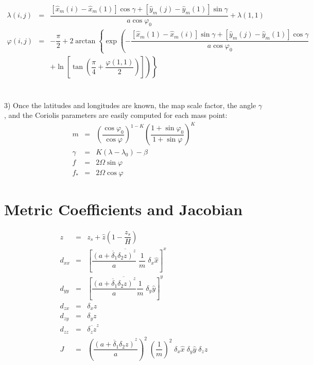 \begin{eqnarray}
\lambda (i,j) &=&  \dfrac{\left[ \widehat{x}_{m}(i)-\widehat{x}_{m}(1) \right]
\cos \gamma + \left[\widehat{y}_{m}(j)-\widehat{y}_{m}(1) \right]\sin \gamma  }
{a \cos \varphi _{0}}
  + \lambda(1,1) \nonumber \\
\varphi (i,j) & = & -\dfrac{\pi}{2} + 2 \arctan \left\{ \exp \left( -
\dfrac{\left[\widehat{x}_{m}(1)-\widehat{x}_{m}(i) \right]
\sin \gamma + \left[\widehat{y}_{m}(j)-\widehat{y}_{m}(1) \right]\cos \gamma  }{a \cos \varphi _{0} } \right. \right.  \nonumber \\
& & \left. \left. +  \ln \left[ \tan (\dfrac{\pi}{4} +\dfrac{ \varphi(1,1)}{2})
\right]
\right)
\right\}
\end{eqnarray}
\\
\\
3) Once the latitudes and longitudes are known, the map scale factor,
the angle $\gamma$, and the Coriolis parameters are easily
computed for each mass point:
\begin{eqnarray}
m&=&\left( \dfrac{\cos \varphi _{0}}{\cos \varphi}\right)^{1-K}
\left( \dfrac{1 + \sin\varphi _{0}}{1 + \sin\varphi} \right)^{K} \\
\gamma & = & K (\lambda - \lambda _{0}) - \beta \nonumber \\
f&=&2\Omega \sin\varphi \\
f_{*}&=&2\Omega \cos\varphi
\end{eqnarray}


\section{Metric Coefficients and Jacobian}

\begin{eqnarray}
z & = & z_{s} + \widehat{z} \left( 1 - \dfrac{z_{s}}{H} \right) \\
 d_{xx} &  = & \overline{ \left[ \dfrac{\overline{\left(a+ \delta _{1}\delta _{2} z\right)}^{z}}{a}
\;  \dfrac{1}{m}\;  \delta_{x}\widehat{x} \right]}^{x} \\
 d_{yy}  & = & \overline{ \left[\dfrac{ \overline{\left(a+ \delta _{1}\delta _{2} z \right)}^{z}}{a}
 \dfrac{1}{m}\; \delta_y \widehat{y} \right] }^{y} \\
 d_{zx} & = & \delta_{x} z \\  d_{zy} & = & \delta_{y} z \\
 d_{zz} & = & \overline{\delta_{z} z}^z  \\
  J   &  = & \left(
 \dfrac{ \overline{ \left( a+ \delta _{1}\delta _{2} z \right)}^{z}}{a} \right)^{2}
\;  \left( \dfrac{1}{m} \right)^{2} \;
\delta_x \widehat{x} \; \delta_y \widehat{y} \; \delta_z z
\end{eqnarray}

